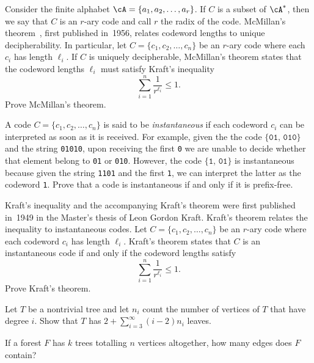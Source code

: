 \begin{problem}
\item Consider the finite alphabet
  $\cA = \{a_1, a_2, \dots, a_r\}$. If $C$ is a subset of $\cA^\ast$,
  then we say that $C$ is an $r$-ary code and call
  $r$ the radix of the code.
  McMillan's
  theorem~\cite{McMillan1956}, first published
  in~1956, relates codeword lengths to unique decipherability. In
  particular, let $C = \{c_1, c_2, \dots, c_n\}$ be an $r$-ary code
  where each $c_i$ has length $\ell_i$. If $C$ is uniquely
  decipherable, McMillan's theorem states that the codeword lengths
  $\ell_i$ must satisfy Kraft's inequality
  \[
  \sum_{i=1}^n \frac{1}{r^{\ell_i}}
  \leq
  1.
  \]
  Prove McMillan's theorem.

\item A code $C = \{c_1, c_2, \dots, c_n\}$ is said to be
  \emph{instantaneous} if each codeword $c_i$ can be interpreted as
  soon as it is received. For example, given the the code
  $\{\texttt{01},\, \texttt{010}\}$ and the string \texttt{01010},
  upon receiving the first \texttt{0} we are unable to decide whether
  that element belong to \texttt{01} or \texttt{010}. However, the
  code $\{\texttt{1},\, \texttt{01}\}$ is instantaneous because given
  the string \texttt{1101} and the first \texttt{1}, we can interpret
  the latter as the codeword \texttt{1}.  Prove that a code is
  instantaneous if and only if it is prefix-free.

\item Kraft's inequality and the accompanying
  Kraft's theorem were first published~\cite{Kraft1949} in~1949 in the
  Master's thesis of Leon Gordon Kraft.
  Kraft's theorem relates the inequality to
  instantaneous codes. Let $C = \{c_1, c_2, \dots, c_n\}$ be an
  $r$-ary code where each codeword $c_i$ has length $\ell_i$. Kraft's
  theorem states that $C$ is an instantaneous code if and only if the
  codeword lengths satisfy
  \[
  \sum_{i=1}^n \frac{1}{r^{\ell_i}}
  \leq
  1.
  \]
  Prove Kraft's theorem.

\item Let $T$ be a nontrivial tree and let $n_i$ count the number of
  vertices of $T$ that have degree $i$. Show that $T$ has
  $2 + \sum_{i=3}^\infty (i - 2) n_i$ leaves.

\item If a forest $F$ has $k$ trees totalling $n$ vertices altogether,
  how many edges does $F$ contain?


\end{problem}
